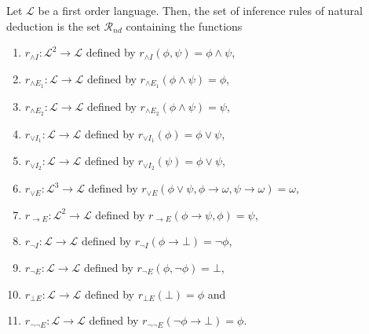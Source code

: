 \begin{definition}
    Let $\mathcal{L}$ be a first order language. Then, the set of inference rules of natural deduction is the set $\mathcal{R}_{nd}$ containing the functions 
    \begin{enumerate}
        \item $r_{\land I} : \mathcal{L}^2 \to \mathcal{L}$ defined by $r_{\land I}(\phi,\psi) = \phi \land \psi$,
        \item $r_{\land E_1} : \mathcal{L} \to \mathcal{L}$ defined by $r_{\land E_1}(\phi \land \psi) = \phi$,
        \item $r_{\land E_2} : \mathcal{L} \to \mathcal{L}$ defined by $r_{\land E_2}(\phi \land \psi) = \psi$,
        \item $r_{\lor I_1} : \mathcal{L} \to \mathcal{L}$ defined by $r_{\lor I_1}(\phi) = \phi \lor \psi$,
        \item $r_{\lor I_2} : \mathcal{L} \to \mathcal{L}$ defined by $r_{\lor I_2}(\psi) = \phi \lor \psi$,
        \item $r_{\lor E} : \mathcal{L}^3 \to \mathcal{L}$ defined by $r_{\lor E}(\phi \lor \psi, \phi \to \omega, \psi \to \omega)=\omega$,
        \item $r_{\to E} : \mathcal{L}^2 \to \mathcal{L}$ defined by $r_{\to E}(\phi \to \psi, \phi)=\psi$,
        \item $r_{\neg I} : \mathcal{L} \to \mathcal{L}$ defined by $r_{\neg I}(\phi \to \bot) = \neg \phi$,
        \item $r_{\neg E} : \mathcal{L} \to \mathcal{L}$ defined by $r_{\neg E}(\phi, \neg \phi)= \bot$,
        \item $r_{\bot E} : \mathcal{L} \to \mathcal{L}$ defined by $r_{\bot E}(\bot)=\phi$ and
        \item $r_{\neg \neg E} : \mathcal{L} \to \mathcal{L}$ defined by $r_{\neg \neg E}(\neg \phi \to \bot)=\phi$.
    \end{enumerate}
\end{definition}

